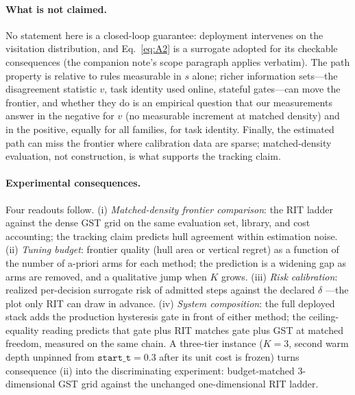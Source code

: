 \documentclass{article}
\begin{document}
\paragraph{What is not claimed.}
No statement here is a closed-loop guarantee: deployment intervenes on the
visitation distribution, and Eq.~\ref{eq:A2} is a surrogate adopted for its
checkable consequences (the companion note's scope paragraph applies
verbatim). The path property is relative to rules measurable in $s$ alone;
richer information sets---the disagreement statistic $v$, task identity used
online, stateful gates---can move the frontier, and whether they do is an
empirical question that our measurements answer in the negative for $v$
(no measurable increment at matched density) and in the positive, equally
for all families, for task identity. Finally, the estimated path can miss
the frontier where calibration data are sparse; matched-density evaluation,
not construction, is what supports the tracking claim.

\paragraph{Experimental consequences.}
Four readouts follow. (i) \emph{Matched-density frontier comparison}: the
RIT ladder against the dense GST grid on the same evaluation set,
library, and cost accounting; the tracking claim predicts hull agreement
within estimation noise. (ii) \emph{Tuning budget}: frontier quality (hull
area or vertical regret) as a function of the number of a-priori arms for
each method; the prediction is a widening gap as arms are removed, and a
qualitative jump when $K$ grows. (iii) \emph{Risk calibration}: realized
per-decision surrogate risk of admitted steps against the declared $\delta$
---the plot only RIT can draw in advance. (iv) \emph{System
composition}: the full deployed stack adds the production hysteresis gate in
front of either method; the ceiling-equality reading predicts that gate
plus RIT matches gate plus GST at matched freedom, measured
on the same chain. A three-tier instance ($K = 3$, second warm depth
unpinned from $\mathtt{start\_t}=0.3$ after its unit cost is frozen) turns
consequence (ii) into the discriminating experiment: budget-matched
$3$-dimensional GST grid against the unchanged one-dimensional RIT ladder.
\end{document}
